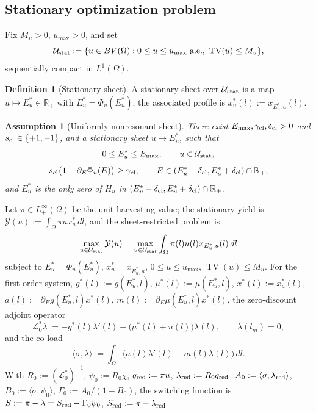 \documentclass[a4paper,fleqn,longmktitle]{cas-sc}
\theoremstyle{plain}
\newtheorem{assumption}[theorem]{Assumption}
\theoremstyle{definition}
\newtheorem{definition}[theorem]{Definition}
\theoremstyle{remark}
\numberwithin{equation}{section}
\begin{document}
\subsection{Stationary optimization problem}
\label{subsec:model_optimization}
Fix \(M_u>0\), \(u_{\max}>0\), and set
\[
    \mathcal U_{\rm stat}
    :=
    \{u\in BV(\Omega):0\le u\le u_{\max}\ \text{a.e.},\
    \operatorname{TV}(u)\le M_u\},
\]
sequentially compact in \(L^1(\Omega)\).
\begin{definition}[Stationary sheet]
\label{def:model_stationary_sheet}
A stationary sheet over \(\mathcal U_{\rm stat}\) is a map
\(u\mapsto E_u^*\in\mathbb R_+\) with \(E_u^*=\Phi_u(E_u^*)\); the associated
profile is \(x_u^*(l):=x_{E_u^*,u}(l)\).
\end{definition}
\begin{assumption}[Uniformly nonresonant sheet]
\label{ass:model_nonresonant_sheet}
There exist \(E_{\max},\gamma_{\rm cl},\delta_{\rm cl}>0\) and
\(s_{\rm cl}\in\{+1,-1\}\), and a stationary sheet \(u\mapsto E_u^*\), such that
\[
    0\le E_u^*\le E_{\max},\qquad u\in\mathcal U_{\rm stat},
\]
\begin{equation}
    \label{eq:model_sheet_margin}
    s_{\rm cl}\big(1-\partial_E\Phi_u(E)\big)
    \ge
    \gamma_{\rm cl},
    \qquad
    E\in(E_u^*-\delta_{\rm cl},E_u^*+\delta_{\rm cl})\cap\mathbb R_+,
\end{equation}
and \(E_u^*\) is the only zero of \(H_u\) in
\((E_u^*-\delta_{\rm cl},E_u^*+\delta_{\rm cl})\cap\mathbb R_+\).
\end{assumption}
Let \(\pi\in L^\infty_+(\Omega)\) be the unit harvesting value; the stationary
yield is \(\mathcal Y(u):=\int_\Omega\pi u x_u^*\,dl\), and the sheet-restricted
problem is
\[
    \max_{u\in\mathcal U_{\rm stat}}
    \mathcal Y(u)
    =
    \max_{u\in\mathcal U_{\rm stat}}
    \int_\Omega \pi(l)u(l)x_{E_u^*,u}(l)\,dl
\]
subject to \(E_u^*=\Phi_u(E_u^*)\), \(x_u^*=x_{E_u^*,u}\),
\(0\le u\le u_{\max}\), \(\operatorname{TV}(u)\le M_u\). For the first-order
system, \(g^*(l):=g(E_u^*,l)\), \(\mu^*(l):=\mu(E_u^*,l)\),
\(x^*(l):=x_u^*(l)\), \(a(l):=\partial_Eg(E_u^*,l)x^*(l)\),
\(m(l):=\partial_E\mu(E_u^*,l)x^*(l)\), the zero-discount adjoint operator
\[
    \mathcal L_0^*\lambda
    :=
    -g^*(l)\lambda'(l)
    +
    \big(\mu^*(l)+u(l)\big)\lambda(l),
    \qquad
    \lambda(l_m)=0,
\]
and the co-load
\[
    \langle\sigma,\lambda\rangle
    :=
    \int_\Omega
    \big(a(l)\lambda'(l)-m(l)\lambda(l)\big)\,dl .
\]
With \(R_0:=(\mathcal L_0^*)^{-1}\), \(\psi_0:=R_0\chi\), \(q_{\rm red}:=\pi u\),
\(\lambda_{\rm red}:=R_0q_{\rm red}\),
\(A_0:=\langle\sigma,\lambda_{\rm red}\rangle\),
\(B_0:=\langle\sigma,\psi_0\rangle\), \(\Gamma_0:=A_0/(1-B_0)\), the switching
function is \(S:=\pi-\lambda=S_{\rm red}-\Gamma_0\psi_0\),
\(S_{\rm red}:=\pi-\lambda_{\rm red}\).
\end{document}
